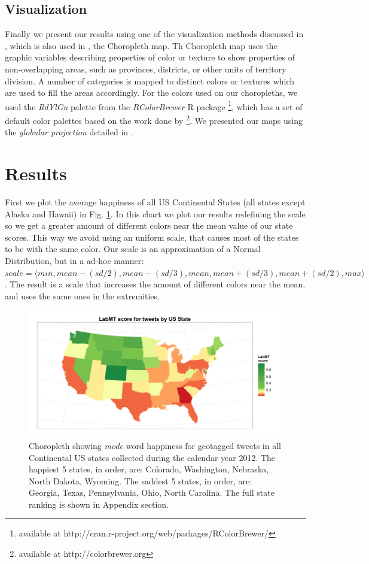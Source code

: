 \documentclass{llncs}
\begin{document}
\subsection{Visualization}
Finally we present our results using one of the visualization methods discussed in \cite{Nollenburg2007}, which is also used in \cite{Mitchell2013,Dodds2011}, the Choropleth map.
Th Choropleth map uses the graphic variables describing properties of color or texture to show properties of non-overlapping areas, such as provinces, districts, or other units of territory division. A number of categories is mapped to distinct colors or textures which are used to fill the areas accordingly. For the colors used on our choropleths, we used the \emph{RdYlGn} palette from the \emph{RColorBrewer} R package \footnote{available at http://cran.r-project.org/web/packages/RColorBrewer/}, which has a set of default color palettes based on the work done by \cite{Harrower2003} \footnote{available at http://colorbrewer.org}. We presented our maps using the \emph{globular projection} detailed in \cite{Bolstad2012}.

\section{Results}
First we plot the average happiness of all US Continental States (all states except Alaska and Hawaii) in Fig. \ref{fig:scores_by_state}. In this chart we plot our results redefining the scale so we get a greater amount of different colors near the mean value of our state scores. This way we avoid using an uniform scale, that causes most of the states to be with the same color. Our scale is an approximation of a Normal Distribution, but in a ad-hoc manner: $scale = \langle min, mean - (sd/2), mean - (sd/3) , mean, mean + (sd/3), mean + (sd/2), max \rangle$. The result is a scale that increases the amount of different colors near the mean, and uses the same ones in the extremities.

\begin{figure}[!ht]
\centering
\includegraphics[width=\textwidth]{images/scores_by_state}
\caption{Choropleth showing \emph{mode} word happiness for geotagged tweets in all Continental US states collected during the calendar year 2012. The happiest 5 states, in order, are: Colorado, Washington, Nebraska, North Dakota, Wyoming. The saddest 5 states, in order, are: Georgia, Texas, Pennsylvania, Ohio, North Carolina. The full state ranking is shown in Appendix section.}
\label{fig:scores_by_state}
\end{figure}
\end{document}
